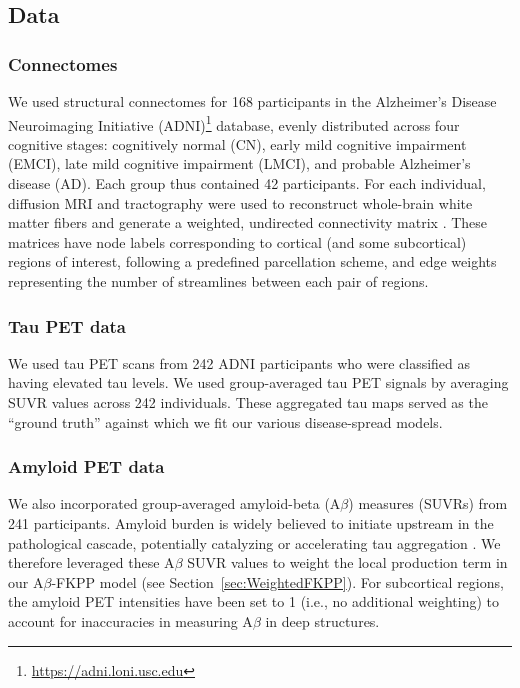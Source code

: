 \subsection{Data}

\subsubsection{Connectomes}
We used structural connectomes for 168 participants in the Alzheimer’s Disease Neuroimaging Initiative (ADNI)\footnote{\url{https://adni.loni.usc.edu}} database, evenly distributed across four cognitive stages: cognitively normal (CN), early mild cognitive impairment (EMCI), late mild cognitive impairment (LMCI), and probable Alzheimer’s disease (AD). Each group thus contained 42 participants. For each individual, diffusion MRI and tractography were used to reconstruct whole-brain white matter fibers and generate a weighted, undirected connectivity matrix \citep{oxtobyDataDrivenSequenceChanges2017}. These matrices have node labels corresponding to cortical (and some subcortical) regions of interest, following a predefined parcellation scheme, and edge weights representing the number of streamlines between each pair of regions.

\subsubsection{Tau PET data}\label{section:tau_data}
We used tau PET scans from 242 ADNI participants who were classified as having elevated tau levels. We used group-averaged tau PET signals by averaging SUVR values across 242 individuals. These aggregated tau maps served as the “ground truth” against which we fit our various disease-spread models.

\subsubsection{Amyloid PET data}\label{section:amyloid_data}
We also incorporated group-averaged amyloid-beta (A$\beta$) measures (SUVRs) from 241 participants. Amyloid burden is widely believed to initiate upstream in the pathological cascade, potentially catalyzing or accelerating tau aggregation \citep{heCoupledmechanismsModellingFramework2023, weickenmeierPhysicsbasedModelExplains2019}. We therefore leveraged these A$\beta$ SUVR values to weight the local production term in our A$\beta$-FKPP model (see Section~\ref{sec:WeightedFKPP}). For subcortical regions, the amyloid PET intensities have been set to 1 (i.e., no additional weighting) to account for inaccuracies in measuring A$\beta$ in deep structures.

